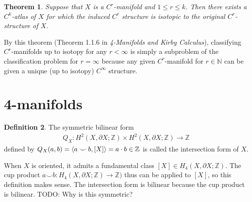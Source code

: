 \documentclass[11pt, psamsfonts]{amsart}
\newtheorem{thm}{Theorem}[section]
\theoremstyle{definition}
\newtheorem{defn}[thm]{Definition}
\theoremstyle{remark}
\numberwithin{equation}{section}
\begin{document}
\begin{thm}
  Suppose that $X$ is a $C^r$-manifold and $1 \leq r \leq k$.
  Then there exists a $C^k$-atlas of $X$ for which the induced $C^r$ structure is isotopic to the original $C^r$-structure of $X$.
\end{thm}

By this theorem (Theorem 1.1.6 in \textit{4-Manifolds and Kirby Calculus}), classifying $C^r$-manifolds up to isotopy for any $r < \infty$ is simply a subproblem of the classification problem for $r = \infty$ because any given $C^r$-manifold for $r \in \mathbb{N}$ can be given a unique (up to isotopy) $C^{\infty}$ structure.

\section{4-manifolds}

\begin{defn}
  The symmetric bilinear form
  \begin{align*}
    Q_X:H^2(X, \partial X; \mathbb{Z}) \times H^2(X, \partial X; \mathbb{Z}) \rightarrow \mathbb{Z}
  \end{align*}
  defined by $Q_X(a, b) = \ev{a \smile b, [X]} = a \cdot b \in \mathbb{Z}$ is called the intersection form of $X$.
\end{defn}

When $X$ is oriented, it admits a fundamental class $[X] \in H_4(X, \partial X; \mathbb{Z})$.
The cup product $a \smile b: H_4(X, \partial X; \mathbb{Z}) \rightarrow \mathbb{Z})$ thus can be applied to $[X]$, so this definition makes sense.
The intersection form is bilinear because the cup product is bilinear.
TODO: Why is this symmetric?
\end{document}
